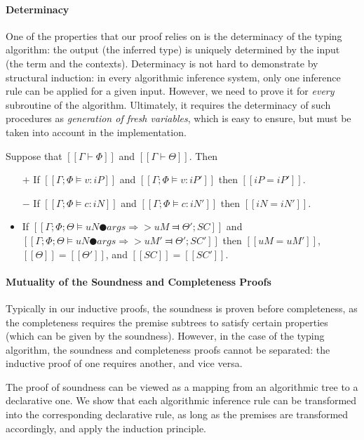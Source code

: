 \paragraph{Determinacy}
    One of the properties that our proof relies on is the determinacy of the 
    typing algorithm: the output (the inferred type)
    is uniquely determined by the input (the term and the contexts).
    Determinacy is not hard to demonstrate by structural induction: 
    in every algorithmic inference system, only one inference rule can be applied 
    for a given input.  However, we need to prove it for \emph{every} 
    subroutine of the algorithm. Ultimately, it requires 
    the determinacy of such procedures as \emph{generation of fresh variables}, 
    which is easy to ensure, but must be taken into account in the implementation.

\begin{lemma*}
    Suppose that $[[Γ ⊢ Φ]]$ and $[[Γ ⊢ Θ]]$. Then 
    \begin{itemize}
        \item [$+$] If $[[Γ; Φ ⊨ v : iP]]$ and $[[Γ; Φ ⊨ v : iP']]$ then $[[iP = iP']]$.
        \item [$-$] If $[[Γ; Φ ⊨ c : iN]]$ and $[[Γ; Φ ⊨ c : iN']]$ then $[[iN = iN']]$.
        \item If $[[Γ; Φ; Θ ⊨ uN ● args ⇒> uM ⫤ Θ'; SC]]$ and 
            $[[Γ; Φ; Θ ⊨ uN ● args ⇒> uM' ⫤ Θ'; SC']]$ then 
            $[[uM = uM']]$, $[[Θ]] = [[Θ']]$, and $[[SC]] =[[SC']]$.  
    \end{itemize}
\end{lemma*}

\paragraph{Mutuality of the Soundness and Completeness Proofs}

Typically in our inductive proofs, the soundness is proven before completeness,
as the completeness requires the premise subtrees to satisfy certain properties
(which can be given by the soundness). However, in the case of the typing algorithm,
the soundness and completeness proofs cannot be separated: the inductive proof
of one requires another, and vice versa. 

The proof of soundness can be viewed as a mapping from an algorithmic tree to a
declarative one. We show that each algorithmic inference rule can be transformed
into the corresponding declarative rule, as long as the premises are transformed
accordingly, and apply the induction principle. 

